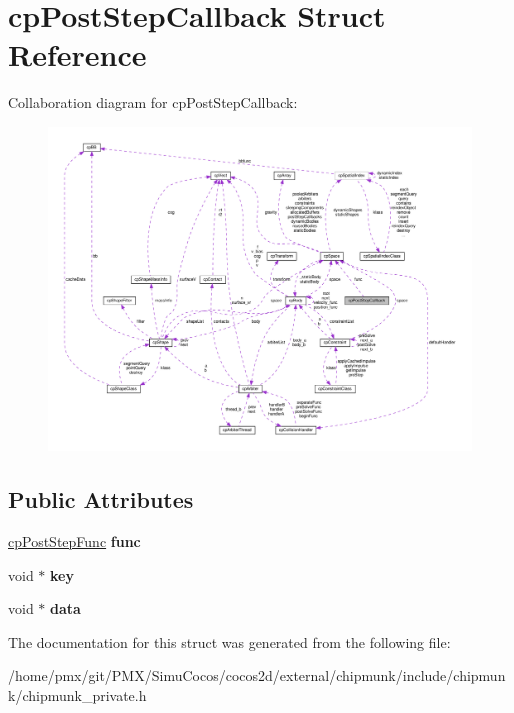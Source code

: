 \hypertarget{structcpPostStepCallback}{}\section{cp\+Post\+Step\+Callback Struct Reference}
\label{structcpPostStepCallback}


Collaboration diagram for cp\+Post\+Step\+Callback\+:
\nopagebreak
\begin{figure}[H]
\begin{center}
\leavevmode
\includegraphics[width=350pt]{structcpPostStepCallback__coll__graph}
\end{center}
\end{figure}
\subsection*{Public Attributes}
\begin{DoxyCompactItemize}
\item 
\mbox{\label{structcpPostStepCallback_a0733e08f69a9b0c993ca16b31ce2d2b8}} 
\hyperlink{group__cpSpace_ga93e9005e387fec86eeb4a225ac295a23}{cp\+Post\+Step\+Func} {\bfseries func}
\item 
\mbox{\label{structcpPostStepCallback_a5c6a7b7db54f4100d8583aeab0f04367}} 
void $\ast$ {\bfseries key}
\item 
\mbox{\label{structcpPostStepCallback_a52133db2d6a81d8d8d514f1f0d8d2554}} 
void $\ast$ {\bfseries data}
\end{DoxyCompactItemize}


The documentation for this struct was generated from the following file\+:\begin{DoxyCompactItemize}
\item 
/home/pmx/git/\+P\+M\+X/\+Simu\+Cocos/cocos2d/external/chipmunk/include/chipmunk/chipmunk\+\_\+private.\+h\end{DoxyCompactItemize}
